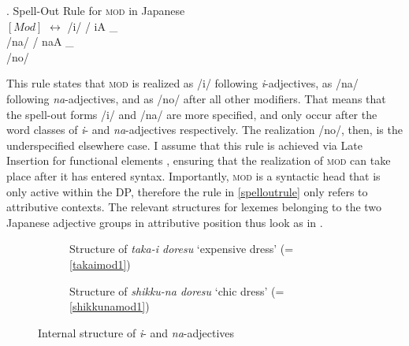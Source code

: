 \ex. Spell-Out Rule for \textsc{mod} in Japanese\\
$[Mod]$ $\leftrightarrow$ /i/ / iA \_ \\
\phantom{$[Mod]$ $\leftrightarrow$} /na/ / naA \_ \\
\phantom{$[Mod]$ $\leftrightarrow$} /no/ \label{spelloutrule}

This rule states that \textsc{mod} is realized as /i/ following \textit{i}-adjectives, as /na/ following \textit{na}-adjectives, and as /no/ after all other modifiers. That means that the spell-out forms /i/ and /na/ are more specified, and only occur after the word classes of \textit{i}- and \textit{na}-adjectives respectively. The realization /no/, then, is the underspecified elsewhere case. I assume that this rule is achieved via Late Insertion for functional elements \citep{halle:1993:distributed, chomsky:2001:derivation}, ensuring that the realization of \textsc{mod} can take place after it has entered syntax. Importantly, \textsc{mod} is a syntactic head that is only active within the DP, therefore the rule in \ref{spelloutrule} only refers to attributive contexts. The relevant structures for lexemes belonging to the two Japanese adjective groups in attributive position thus look as in . 

\begin{figure}

\begin{subfigure}{\textwidth}
\centering
{}
\caption{Structure of \textit{taka-i doresu} `expensive dress’ (= \ref{takaimod1})}
\label{structure taka-i doresu}
\end{subfigure}

\begin{subfigure}{\textwidth}
\centering
{}
\caption{Structure of \textit{shikku-na doresu} `chic dress’ (= \ref{shikkunamod1})}
\label{structure shikku-na doresu}
\end{subfigure}

\caption{Internal structure of \textit{i}- and \textit{na}-adjectives}
\label{internal structure adjectives}

\end{figure}

